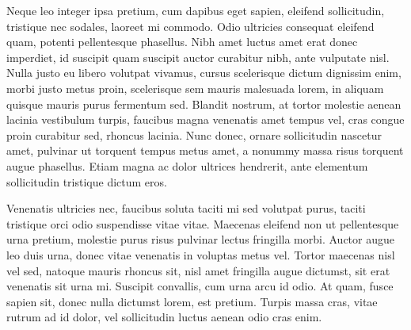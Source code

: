 \begin{singlespace}
\im
Neque leo integer ipsa pretium, cum dapibus eget sapien, eleifend sollicitudin, tristique nec sodales, laoreet mi commodo.
Odio ultricies consequat eleifend quam, potenti pellentesque phasellus.
Nibh amet luctus amet erat donec imperdiet, id suscipit quam suscipit auctor curabitur nibh, ante vulputate nisl.
Nulla justo eu libero volutpat vivamus, cursus scelerisque dictum dignissim enim, morbi justo metus proin, scelerisque sem mauris malesuada lorem, in aliquam quisque mauris purus fermentum sed.
Blandit nostrum, at tortor molestie aenean lacinia vestibulum turpis, faucibus magna venenatis amet tempus vel, cras congue proin curabitur sed, rhoncus lacinia.
Nunc donec, ornare sollicitudin nascetur amet, pulvinar ut torquent tempus metus amet, a nonummy massa risus torquent augue phasellus.
Etiam magna ac dolor ultrices hendrerit, ante elementum sollicitudin tristique dictum eros.
\end{singlespace}

\begin{singlespace}
\im
Venenatis ultricies nec, faucibus soluta taciti mi sed volutpat purus, taciti tristique orci odio suspendisse vitae vitae.
Maecenas eleifend non ut pellentesque urna pretium, molestie purus risus pulvinar lectus fringilla morbi.
Auctor augue leo duis urna, donec vitae venenatis in voluptas metus vel.
Tortor maecenas nisl vel sed, natoque mauris rhoncus sit, nisl amet fringilla augue dictumst, sit erat venenatis sit urna mi.
Suscipit convallis, cum urna arcu id odio.
At quam, fusce sapien sit, donec nulla dictumst lorem, est pretium.
Turpis massa cras, vitae rutrum ad id dolor, vel sollicitudin luctus aenean odio cras enim.
\end{singlespace}

